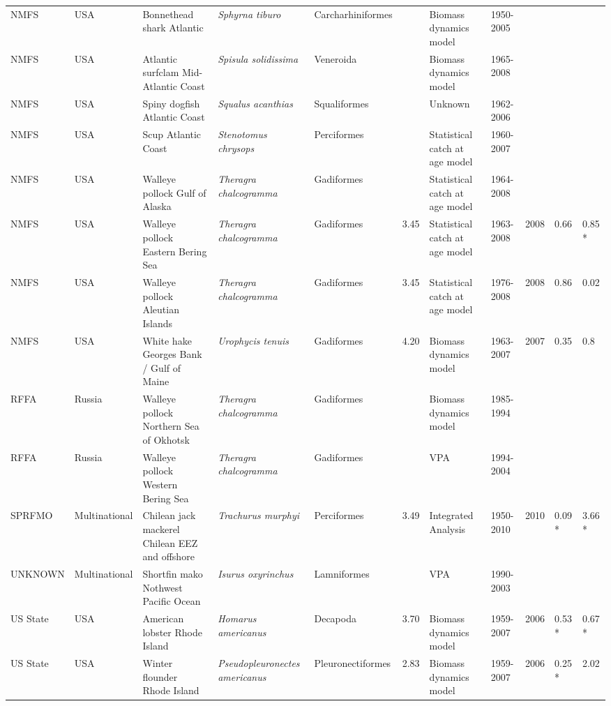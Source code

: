 \begin{longtable}{p{1.5cm}p{1.5cm}p{3cm}p{3cm}p{2.5cm}p{0.9cm}p{1.4cm}p{0.9cm}p{0.9cm}p{0.9cm}p{1cm}}
  NMFS & USA & Bonnethead shark Atlantic & \textit{Sphyrna tiburo} & Carcharhiniformes &  & Biomass dynamics model & 1950-2005 &  &  &  \\ 
  NMFS & USA & Atlantic surfclam Mid-Atlantic Coast & \textit{Spisula solidissima} & Veneroida &  & Biomass dynamics model & 1965-2008 &  &  &  \\ 
  NMFS & USA & Spiny dogfish Atlantic Coast & \textit{Squalus acanthias} & Squaliformes &  & Unknown & 1962-2006 &  &  &  \\ 
  NMFS & USA & Scup Atlantic Coast & \textit{Stenotomus chrysops} & Perciformes &  & Statistical catch at age model & 1960-2007 &  &  &  \\ 
  NMFS & USA & Walleye pollock Gulf of Alaska & \textit{Theragra chalcogramma} & Gadiformes &  & Statistical catch at age model & 1964-2008 &  &  &  \\ 
  NMFS & USA & Walleye pollock Eastern Bering Sea & \textit{Theragra chalcogramma} & Gadiformes & 3.45 & Statistical catch at age model & 1963-2008 & 2008 & 0.66 & 0.85 * \\ 
  NMFS & USA & Walleye pollock Aleutian Islands & \textit{Theragra chalcogramma} & Gadiformes & 3.45 & Statistical catch at age model & 1976-2008 & 2008 & 0.86 & 0.02 \\ 
  NMFS & USA & White hake Georges Bank / Gulf of Maine & \textit{Urophycis tenuis} & Gadiformes & 4.20 & Biomass dynamics model & 1963-2007 & 2007 & 0.35 & 0.8 \\ 
  RFFA & Russia & Walleye pollock Northern Sea of Okhotsk & \textit{Theragra chalcogramma} & Gadiformes &  & Biomass dynamics model & 1985-1994 &  &  &  \\ 
  RFFA & Russia & Walleye pollock Western Bering Sea & \textit{Theragra chalcogramma} & Gadiformes &  & VPA & 1994-2004 &  &  &  \\ 
  SPRFMO & Multinational & Chilean jack mackerel Chilean EEZ and offshore & \textit{Trachurus murphyi} & Perciformes & 3.49 & Integrated Analysis & 1950-2010 & 2010 & 0.09 * & 3.66 * \\ 
  UNKNOWN & Multinational & Shortfin mako Nothwest Pacific Ocean & \textit{Isurus oxyrinchus} & Lamniformes &  & VPA & 1990-2003 &  &  &  \\ 
  US State & USA & American lobster Rhode Island & \textit{Homarus americanus} & Decapoda & 3.70 & Biomass dynamics model & 1959-2007 & 2006 & 0.53 * & 0.67 * \\ 
  US State & USA & Winter flounder Rhode Island & \textit{Pseudopleuronectes americanus} & Pleuronectiformes & 2.83 & Biomass dynamics model & 1959-2007 & 2006 & 0.25 * & 2.02 \\ 

\end{longtable}
